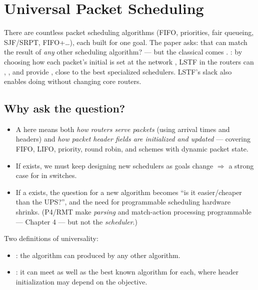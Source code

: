 \chapter{Universal Packet Scheduling}

\begin{keybox}
There are countless packet scheduling algorithms (FIFO, priorities, fair queueing, SJF/SRPT, FIFO+\ldots), each built for one goal. The paper asks:  that can match the result of \emph{any} other scheduling algorithm?  --- but the classical  comes . : by choosing how each packet's initial  is set at the network , LSTF in the routers can , , and provide , close to the best specialized schedulers. LSTF's slack also enables doing  without changing core routers.
\end{keybox}

\section{Why ask the question?}
\begin{itemize}
\item A  here means both \emph{how routers serve packets} (using arrival times and headers) and \emph{how packet header fields are initialized and updated} --- covering FIFO, LIFO, priority, round robin, and schemes with dynamic packet state.
\item If  exists, we must keep designing new schedulers as goals change $\Rightarrow$ a strong case for  in switches.
\item If a  exists, the question for a new algorithm becomes ``is it easier/cheaper than the UPS?'', and the need for programmable scheduling hardware shrinks. (P4/RMT make \emph{parsing} and match-action processing programmable --- Chapter 4 --- but not the \emph{scheduler}.)
\end{itemize}
Two definitions of universality:
\begin{itemize}
\item {}: the algorithm can  produced by any other algorithm.
\item {}: it can meet  as well as the best known algorithm for each, where header initialization may depend on the objective.
\end{itemize}

